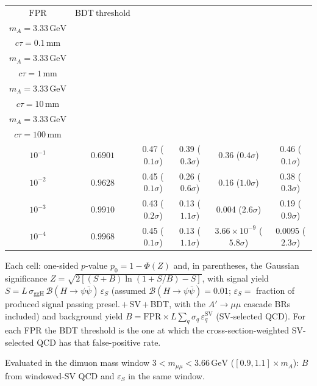 \documentclass[10pt,a4paper]{article}
\begin{document}
{\begin{tabular}{cccccc}
\toprule
$\mathrm{FPR}$ & $\mathrm{BDT\ threshold}$ & \shortstack{$m_{\pi}=10\,\mathrm{GeV}$\\$m_{A}=3.33\,\mathrm{GeV}$\\$c\tau=0.1\,\mathrm{mm}$} & \shortstack{$m_{\pi}=10\,\mathrm{GeV}$\\$m_{A}=3.33\,\mathrm{GeV}$\\$c\tau=1\,\mathrm{mm}$} & \shortstack{$m_{\pi}=10\,\mathrm{GeV}$\\$m_{A}=3.33\,\mathrm{GeV}$\\$c\tau=10\,\mathrm{mm}$} & \shortstack{$m_{\pi}=10\,\mathrm{GeV}$\\$m_{A}=3.33\,\mathrm{GeV}$\\$c\tau=100\,\mathrm{mm}$} \\
\midrule
$10^{-1}$ & $0.6901$ & 0.47 ($0.1\sigma$) & 0.39 ($0.3\sigma$) & 0.36 ($0.4\sigma$) & 0.46 ($0.1\sigma$)\\
$10^{-2}$ & $0.9628$ & 0.45 ($0.1\sigma$) & 0.26 ($0.6\sigma$) & 0.16 ($1.0\sigma$) & 0.38 ($0.3\sigma$)\\
$10^{-3}$ & $0.9910$ & 0.43 ($0.2\sigma$) & 0.13 ($1.1\sigma$) & 0.004 ($2.6\sigma$) & 0.19 ($0.9\sigma$)\\
$10^{-4}$ & $0.9968$ & 0.45 ($0.1\sigma$) & 0.13 ($1.1\sigma$) & $3.66\times10^{-9}$ ($5.8\sigma$) & 0.0095 ($2.3\sigma$)\\
\bottomrule
\end{tabular}

{\small Each cell: one-sided $p$-value $p_0=1-\Phi(Z)$ and, in parentheses, the Gaussian significance $Z=\sqrt{2\left[(S{+}B)\ln(1{+}S/B)-S\right]}$, with signal yield $S=L\,\sigma_{\mathrm{ggH}}\,\mathcal{B}(H\to\psi\bar{\psi})\,\varepsilon_S$ (assumed $\mathcal{B}(H\to\psi\bar{\psi})=0.01$; $\varepsilon_S=$ fraction of produced signal passing presel.\,$+$\,SV\,$+$\,BDT, with the $A'\to\mu\mu$ cascade BRs included) and background yield $B=\mathrm{FPR}\times L\sum_q\sigma_q\,\varepsilon_q^{\mathrm{SV}}$ (SV-selected QCD). For each FPR the BDT threshold is the one at which the cross-section-weighted SV-selected QCD has that false-positive rate.}

{\small Evaluated in the dimuon mass window $3<m_{\mu\mu}<3.66\,\mathrm{GeV}$ ($[0.9,1.1]\times m_A$): $B$ from windowed-SV QCD and $\varepsilon_S$ in the same window.}

}\clearpage
\end{document}
